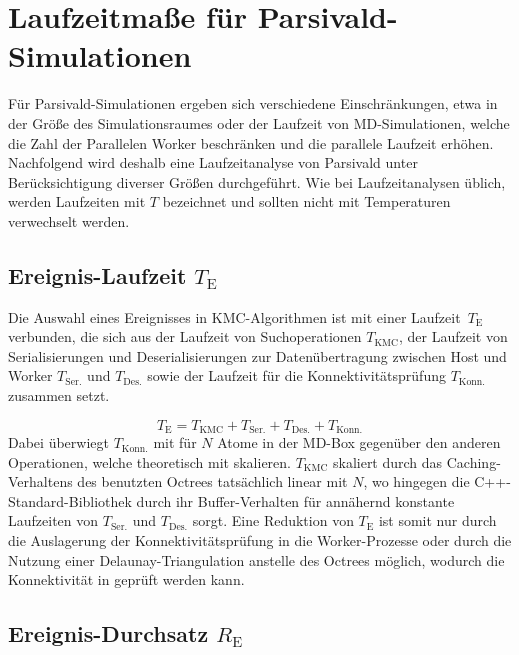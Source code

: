 \section{Laufzeitmaße für Parsivald-Simulationen}

Für Parsivald-Simulationen ergeben sich verschiedene Einschränkungen, etwa in der Größe des Simulationsraumes oder der Laufzeit von MD-Simulationen, welche die Zahl der Parallelen Worker beschränken und die parallele Laufzeit erhöhen.
Nachfolgend wird deshalb eine Laufzeitanalyse von Parsivald unter Berücksichtigung diverser Größen durchgeführt.
Wie bei Laufzeitanalysen üblich, werden Laufzeiten mit $T$ bezeichnet und sollten nicht mit Temperaturen verwechselt werden.

\subsection{Ereignis-Laufzeit $T_\text{E}$}

Die Auswahl eines Ereignisses in KMC-Algorithmen ist mit einer Laufzeit~$T_\text{E}$ verbunden, die sich aus der Laufzeit von Suchoperationen $T_\text{KMC}$, der Laufzeit von Serialisierungen und Deserialisierungen zur Datenübertragung zwischen Host und Worker $T_\text{Ser.}$ und $T_\text{Des.}$ sowie der Laufzeit für die Konnektivitätsprüfung $T_\text{Konn.}$ zusammen setzt.

\begin{equation}
T_\text{E} = T_\text{KMC} + T_\text{Ser.} + T_\text{Des.} + T_\text{Konn.}
\end{equation}
Dabei überwiegt $T_\text{Konn.}$ mit  für $N$ Atome in der MD-Box gegenüber den anderen Operationen, welche theoretisch mit  skalieren.
$T_\text{KMC}$ skaliert durch das Caching-Verhaltens des benutzten Octrees tatsächlich linear mit $N$, wo hingegen die C++-Standard-Bibliothek durch ihr Buffer-Verhalten für annähernd konstante Laufzeiten von $T_\text{Ser.}$ und $T_\text{Des.}$ sorgt.
Eine Reduktion von $T_\text{E}$ ist somit nur durch die Auslagerung der Konnektivitätsprüfung in die Worker-Prozesse oder durch die Nutzung einer Delaunay-Triangulation anstelle des Octrees möglich, wodurch die Konnektivität in  geprüft werden kann.

\subsection{Ereignis-Durchsatz $R_\text{E}$}

